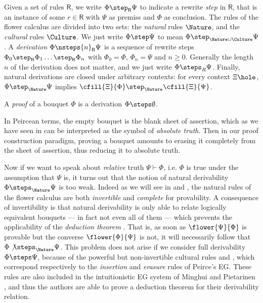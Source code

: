 \begin{definition}[Derivation]
  Given a set of rules $\mathsf{R}$, we write $\Phi \step_{\mathsf{R}} \Psi$ to
  indicate a rewrite \emph{step} in $\mathsf{R}$, that is an instance of some
  $r \in \mathsf{R}$ with $\Psi$ as premiss and $\Phi$ as conclusion.
  The rules of the flower calculus are divided into two sets: the \emph{natural}
  rules $\Nature$, and the \emph{cultural} rules $\Culture$. We just write $\Phi
  \step \Psi$ to mean $\Phi \step_{\Nature\cup\Culture} \Psi$. A
  \emph{derivation} $\Phi \nsteps{n}_{\mathsf{R}} \Psi$ is a sequence of rewrite
  steps $\Phi_0 \step_{\mathsf{R}} \Phi_1 \ldots \step_{\mathsf{R}} \Phi_n$ with
  $\Phi_0 = \Phi$, $\Phi_n = \Psi$ and $n \geq 0$. Generally the length $n$ of
  the derivation does not matter, and we just write $\Phi \steps_R \Psi$.
  Finally, natural derivations are closed under arbitrary contexts: for every
  context $\Xi\hole$, $\Phi \step_\Nature \Psi$ implies $\cfill{\Xi}{\Phi}
  \step_\Nature \cfill{\Xi}{\Psi}$.
\end{definition}


\begin{definition}[Proof]
  A \emph{proof} of a bouquet $\Phi$ is a derivation $\Phi \steps \emptyset$.
\end{definition}

In Peircean terms, the empty bouquet is the blank sheet of assertion, which as
we have seen in  can be interpreted as the symbol of \emph{absolute
truth}. Then in our proof construction paradigm, proving a bouquet amounts to
erasing it completely from the sheet of assertion, thus reducing it to absolute
truth.

Now if we want to speak about \emph{relative} truth $\Psi \vdash \Phi$, i.e.
$\Phi$ is true under the assumption that $\Psi$ is, it turns out that the notion
of natural derivability $\Phi \steps_{\Nature} \Psi$ is too weak. Indeed as we
will see in  and , the natural rules of
the flower calculus are both \emph{invertible} and \emph{complete} for
provability. A consequence of invertibility is that natural derivability is only
able to relate logically equivalent bouquets --- in fact not even all of them
--- which prevents the applicability of the \emph{deduction theorem}
. That is, as soon as $\flower{\Psi}{\Phi}$ is provable but
the converse $\flower{\Phi}{\Psi}$ is not, it will necessarily follow that $\Phi
\not\steps_{\Nature} \Psi$. This problem does not arise if we consider full
derivability $\Phi \steps \Psi$, because of the powerful but non-invertible
cultural rules  and , which correspond respectively to the
\emph{insertion} and \emph{erasure} rules of Peirce's EG. These rules are also
included in the intuitionistic EG system of Minghui and Pietarinen
, and thus the authors are able to prove a
deduction theorem for their derivability relation.

